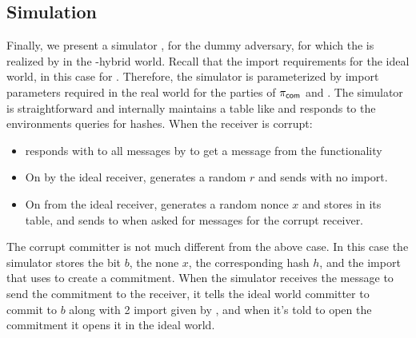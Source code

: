 
\subsection{Simulation}
Finally, we present a simulator \simcom, for the dummy adversary, for which the \Fcom is realized by  in the \Fropp-hybrid world.
Recall that the import requirements for the ideal world, in this case for \Fcom. Therefore, the simulator is parameterized by import parameters required in the real world for the parties of $\pi_{\mathsf{com}}$ and \Fro.
The simulator is straightforward and internally maintains a table like \Fro and responds to the environments queries for hashes. 
When the receiver is corrupt:
\begin{itemize}
\item \simcom responds with  to all messages by \Z to get a message from the functionality
\item On  by the ideal receiver, \simcom generates a random $r$ and sends  with no import.
\item On  from the ideal receiver, \simcom generates a random nonce $x$ and stores  in its \Fro table, and sends  to \Z when asked for messages for the corrupt receiver.
\end{itemize}

The corrupt committer is not much different from the above case. In this case
the simulator stores the bit $b$, the none $x$, the corresponding hash $h$, and the import that \Z uses to create a commitment.
When the simulator receives the message to send the commitment to the receiver, it tells the ideal world committer to commit to $b$ along with 2 import given by \Z, and when it's told to open the commitment it opens it in the ideal world. 


